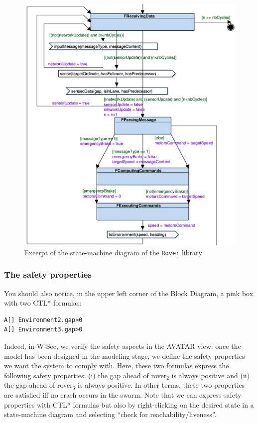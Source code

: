 \documentclass{article}
\begin{document}
\begin{figure}
	\centering
	\includegraphics[scale=.6]{figures/roverfsm.pdf}
	\caption{Excerpt of the state-machine diagram of the \texttt{Rover} library}
	\label{fig:roversmd}
\end{figure}

\subsubsection{The safety properties}

You should also notice, in the upper left corner of the Block Diagram, a pink box with two CTL* formulas:
\begin{verbatim}
A[] Environment2.gap>0
A[] Environment3.gap>0
\end{verbatim}
Indeed, in W-Sec, we verify the safety aspects in the AVATAR view: once the model has been designed in the modeling stage, we define the safety properties we want the system to comply with. Here, these two formulas express the following safety properties: (i) the gap ahead of rover$_2$ is always positive and (ii) the gap ahead of rover$_3$ is always positive. In other terms, these two properties are satisfied iff no crash occurs in the swarm. Note that we can express safety properties with CTL* formulas but also by right-clicking on the desired state in a state-machine diagram and selecting ``check for reachability/liveness''.
\end{document}
